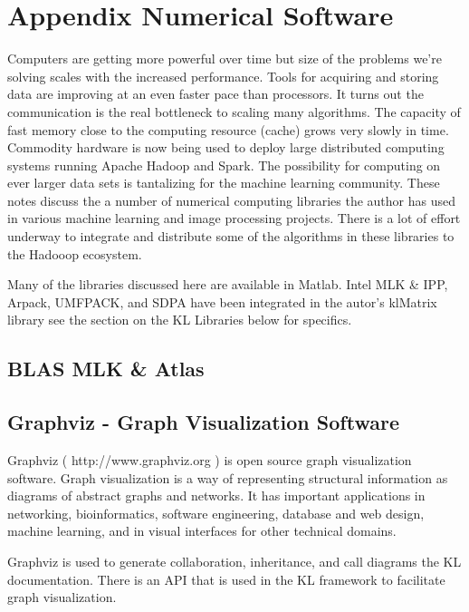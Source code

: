 
\chapter{Appendix Numerical Software}
Computers are getting more powerful over time but size of the problems we're solving scales with the increased performance. Tools for acquiring and storing data are improving at an even faster pace than processors.  It turns out the communication is the real bottleneck to scaling many algorithms. The capacity of fast memory close to the computing resource (cache) grows very slowly in time.  Commodity hardware is now being used to deploy large distributed computing systems running Apache Hadoop and Spark. The possibility for computing on ever larger data sets is tantalizing for the machine learning community.
These notes discuss the a number of numerical computing libraries the author has used in various machine learning and image processing projects.  There is a lot of effort underway to integrate and distribute some of the algorithms in these libraries to the Hadooop ecosystem.

Many of the libraries discussed here are available in Matlab. Intel MLK \& IPP, Arpack, UMFPACK, and SDPA have been integrated in the autor's klMatrix library see the section on the KL Libraries below for specifics.

\section*{BLAS MLK \& Atlas}

\section*{Graphviz - Graph Visualization Software}
Graphviz ( http://www.graphviz.org ) is open source graph visualization software. Graph visualization is a way of representing structural information as diagrams of abstract graphs and networks. It has important applications in networking, bioinformatics,  software engineering, database and web design, machine learning, and in visual interfaces for other technical domains.

Graphviz is used to generate collaboration, inheritance, and call diagrams the KL documentation. There is an API that is used in the KL framework to facilitate graph visualization.

